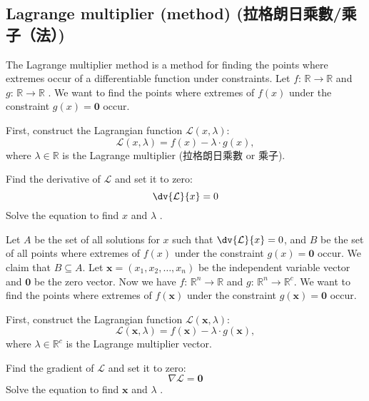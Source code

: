 \documentclass[a4paper,12pt]{report}
\begin{document}
\begin{itemize}
\begin{itemize}
\subsection{Lagrange multiplier (method) (拉格朗日乘數/乘子（法）)}
The Lagrange multiplier method is a method for finding the points where extremes occur of a differentiable function under constraints.
Let $f:\,\mathbb{R} \rightarrow \mathbb{R}$ and $g:\,\mathbb{R} \rightarrow \mathbb{R}$ . We want to find the points where extremes of \( f(x) \) under the constraint \( g(x) = \mathbf{0} \) occur. 

First, construct the Lagrangian function \( \mathcal{L}(x,\lambda) \):
\[\mathcal{L}(x,\lambda) = f(x) - \lambda \cdot g(x),\]
where \( \lambda\in\mathbb{R} \) is the Lagrange multiplier (拉格朗日乘數 or 乘子).

Find the derivative of $\mathcal{L}$ and set it to zero:
\[
\dv{\mathcal{L}}{x} = 0
\]
Solve the equation to find \( x \) and \( \lambda \) . 

 Let $A$ be the set of all solutions for \( x \) such that $\dv{\mathcal{L}}{x} = 0$, and $B$ be the set of all points where extremes of \( f(x) \) under the constraint \( g(x) = \mathbf{0} \) occur. We claim that $B\subseteq A$.
Let \( \mathbf{x} = (x_1, x_2, \dots, x_n) \) be the independent variable vector and $\mathbf{0}$ be the zero vector. Now we have $f:\,\mathbb{R}^n \rightarrow \mathbb{R}$ and $g:\,\mathbb{R}^n \rightarrow \mathbb{R}^c$. We want to find the points where extremes of \( f(\mathbf{x}) \) under the constraint \( g(\mathbf{x}) = \mathbf{0}\) occur. 

First, construct the Lagrangian function \( \mathcal{L}(\mathbf{x},\lambda) \):
\[
\mathcal{L}(\mathbf{x},\lambda) = f(\mathbf{x}) - \lambda \cdot g(\mathbf{x}),
\]
where \( \lambda\in\mathbb{R}^c \) is the Lagrange multiplier vector.

Find the gradient of $\mathcal{L}$ and set it to zero:
\[
\nabla \mathcal{L} = \mathbf{0}
\]
Solve the equation to find \( \mathbf{x} \) and \( \lambda \) . 


\end{itemize}
\end{itemize}
\end{document}
